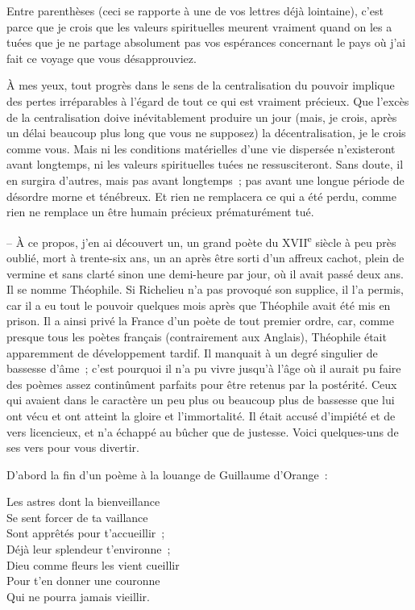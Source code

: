 \documentclass[french,twoside]{book} %
\newenvironment{quoteblock}%
  {\begin{quoting}}
  {\end{quoting}}
\newenvironment{quotebar}{%
    \def\FrameCommand{{\color{rubric!10!}\vrule width 0.5em} \hspace{0.9em}}%
    \def\OuterFrameSep{\itemsep} %
    \MakeFramed {\advance\hsize-\width \FrameRestore}
  }%
  {%
    \endMakeFramed
  }
\renewenvironment{quoteblock}%
  {%
    \savenotes
    \setstretch{0.9}
    \normalfont
    \begin{quotebar}
  }
  {%
    \end{quotebar}
    \spewnotes
  }
\begin{document}
Entre parenthèses (ceci se rapporte à une de vos lettres déjà lointaine), c'est parce que je crois que les valeurs spirituelles meurent vraiment quand on les a tuées que je ne partage absolument pas vos espérances concernant le pays où j'ai fait ce voyage que vous désapprouviez.\par
À mes yeux, tout progrès dans le sens de la centralisation du pouvoir implique des pertes irréparables à l'égard de tout ce qui est vraiment précieux. Que l'excès de la centralisation doive inévitablement produire un jour (mais, je crois, après un délai beaucoup plus long que vous ne supposez) la décen­tralisation, je le crois comme vous. Mais ni les conditions matérielles d'une vie dispersée n'existeront avant longtemps, ni les valeurs spirituelles tuées ne ressusciteront. Sans doute, il en surgira d'autres, mais pas avant longtemps ; pas avant une longue période de désordre morne et ténébreux. Et rien ne remplacera ce qui a été perdu, comme rien ne remplace un être humain précieux prématurément tué.\par
– À ce propos, j'en ai découvert un, un grand poète du XVII\textsuperscript{e} siècle à peu près oublié, mort à trente-six ans, un an après être sorti d'un affreux cachot, plein de vermine et sans clarté sinon une demi-heure par jour, où il avait passé deux ans. Il se nomme Théophile. Si Richelieu n'a pas provoqué son supplice, il l'a permis, car il a eu tout le pouvoir quelques mois après que Théophile avait été mis en prison. Il a ainsi privé la France d'un poète de tout premier ordre, car, comme presque tous les poètes français (contrairement aux Anglais), Théophile était apparemment de développement tardif. Il manquait à un degré singulier de bassesse d'âme ; c'est pourquoi il n'a pu vivre jusqu'à l'âge où il aurait pu faire des poèmes assez continûment parfaits pour être retenus par la postérité. Ceux qui avaient dans le caractère un peu plus ou beaucoup plus de bassesse que lui ont vécu et ont atteint la gloire et l'immor­talité. Il était accusé d'impiété et de vers licencieux, et n'a échappé au bûcher que de justesse. Voici quelques-uns de ses vers pour vous divertir.\par
D'abord la fin d'un poème à la louange de Guillaume d'Orange :\par

\begin{quoteblock}
 \noindent Les astres dont la bienveillance \\
Se sent forcer de ta vaillance \\
Sont apprêtés pour t'accueillir ; \\
Déjà leur splendeur t'environne ; \\
Dieu comme fleurs les vient cueillir \\
Pour t'en donner une couronne \\
Qui ne pourra jamais vieillir.
 \end{quoteblock}
\end{document}
